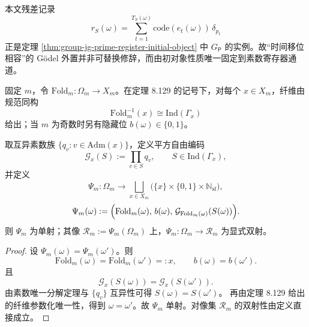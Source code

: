 \begin{remark}[与本文残差寄存器接口的同一性]\label{rem:group-jg-prime-register-initial-object-interface}
本文残差记录
\[
r_S(\omega)=\sum_{t=1}^{T_S(\omega)}\mathrm{code}(e_t(\omega))\,\delta_{p_t}
\]
正是定理 \ref{thm:group-jg-prime-register-initial-object} 中 \(G_{\mathsf P}\) 的实例。故“时间移位相容”的 Gödel 外置并非可替换修辞，而由初对象性质唯一固定到素数寄存器通道。
\end{remark}

\begin{theorem}\label{thm:group-jg-fold-squarefree-externalization}
固定 \(m\)，令 \(\mathrm{Fold}_m:\Omega_m\to X_m\)。在定理 8.129 的记号下，对每个 \(x\in X_m\)，纤维由规范同构
\[
\mathrm{Fold}_m^{-1}(x)\cong \mathrm{Ind}(\Gamma_x)
\]
给出；当 \(m\) 为奇数时另有隐藏位 \(b(\omega)\in\{0,1\}\)。

取互异素数族 \(\{q_v:v\in\mathrm{Adm}(x)\}\)，定义平方自由编码
\[
\mathcal G_x(S):=\prod_{v\in S} q_v,\qquad
S\in \mathrm{Ind}(\Gamma_x),
\]
并定义
\[
\Psi_m:\Omega_m\longrightarrow
\bigsqcup_{x\in X_m}\bigl(\{x\}\times\{0,1\}\times\mathbb{N}_{\mathrm{sf}}\bigr),
\]
\[
\Psi_m(\omega):=
\Bigl(\mathrm{Fold}_m(\omega),\,b(\omega),\,\mathcal G_{\mathrm{Fold}_m(\omega)}(S(\omega))\Bigr).
\]
则 \(\Psi_m\) 为单射；其像
\(
\mathcal R_m:=\Psi_m(\Omega_m)
\)
上，\(\Psi_m:\Omega_m\to\mathcal R_m\) 为显式双射。
\end{theorem}
\begin{proof}
设 \(\Psi_m(\omega)=\Psi_m(\omega')\)。则
\[
\mathrm{Fold}_m(\omega)=\mathrm{Fold}_m(\omega')=:x,\qquad
b(\omega)=b(\omega').
\]
且
\[
\mathcal G_x(S(\omega))=\mathcal G_x(S(\omega')).
\]
由素数唯一分解定理与 \(\{q_v\}\) 互异性可得
\(
S(\omega)=S(\omega')
\)。
再由定理 8.129 给出的纤维参数化唯一性，得到 \(\omega=\omega'\)。故 \(\Psi_m\) 单射。对像集 \(\mathcal R_m\) 的双射性由定义直接成立。
\end{proof}

